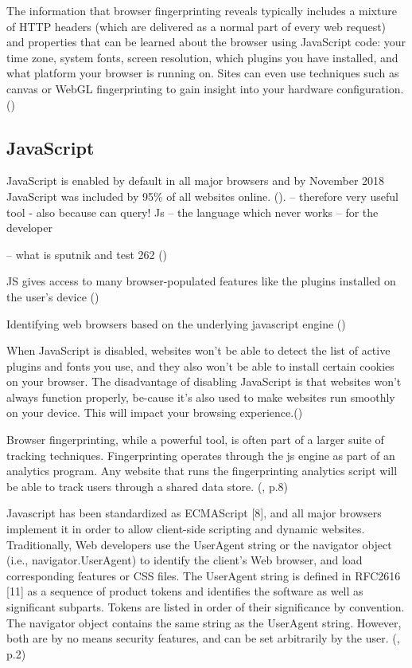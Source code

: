 The information that browser fingerprinting reveals typically includes a mixture of HTTP headers (which are delivered as a normal part of every web request) and properties that can be learned about the browser using JavaScript code: your time zone, system fonts, screen resolution, which plugins you have installed, and what platform your browser is running on. Sites can even use techniques such as canvas or WebGL fingerprinting to gain insight into your hardware configuration.(\textcite{miele18})

\subsection{JavaScript}\label{JS}

JavaScript is enabled by default in all major browsers and by November 2018 JavaScript was included by 95\% of all websites online. (\textcite{w3techs18}).
-- therefore very useful tool - also because can query!
Js – the language which never works – for the developer

-- what is sputnik and test 262 ()

JS gives access to many browser-populated features like the plugins installed on the user’s device (\textcite{amiunique})

Identifying web browsers based on the underlying javascript engine
(\textcite{mulazzani13})

When JavaScript is disabled, websites won’t be able to detect the list of active plugins and fonts you use, and they also won’t be able to install certain cookies on your browser.
The disadvantage of disabling JavaScript is that websites won’t always function properly, be-cause it’s also used to make websites run smoothly on your device. This will impact your browsing experience.(\textcite{pixel18})

Browser fingerprinting, while a powerful tool, is often part of a larger suite of tracking techniques. Fingerprinting operates through the js engine as part of an analytics program. Any website that runs the fingerprinting analytics script will be able to track users through a shared data store.
(\textcite{havens16}, p.8)


Javascript has been standardized as ECMAScript [8],
and all major browsers implement it in order to allow
client-side scripting and dynamic websites. Traditionally,
Web developers use the UserAgent string or the navigator
object (i.e., navigator.UserAgent) to identify the client’s
Web browser, and load corresponding features or CSS files.
The UserAgent string is defined in RFC2616 [11] as a
sequence of product tokens and identifies the software as
well as significant subparts. Tokens are listed in order of their
significance by convention. The navigator object contains the
same string as the UserAgent string. However, both are by
no means security features, and can be set arbitrarily by the
user.
(\textcite{mulazzani13}, p.2)\\

